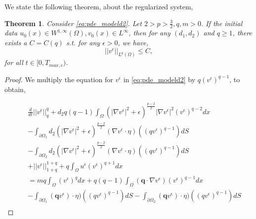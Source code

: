 \documentclass[10pt]{amsart}
\theoremstyle{plain}
\newtheorem{theorem}{Theorem}[section]
\theoremstyle{definition}
\begin{document}
\noindent We state the following theorem, about the regularized system,

\begin{theorem}
\label{thm:mt1-1}
    Consider \eqref{eq:pde_modeld2}. Let $2>p>\frac{3}{2}, q,m>0$. If the initial data $u_{0}(x) \in W^{1,\infty}(\Omega), v_{0}(x) \in L^{\infty}$, then for any $(d_{1},d_{2})$ and $q \geq 1$, there exists a $C=C(q)$ s.t. for any $ \epsilon > 0$, we have,
\begin{equation}
    ||v^{\epsilon}||_{L^{q}(\Omega)} \leq C,
\end{equation}
  for all $t \in [0, T_{max, \epsilon})$.
\end{theorem}

\begin{proof}
We multiply the equation for $v^{\epsilon}$ in \eqref{eq:pde_modeld2} by $q(v^{\epsilon})^{q-1}$, to obtain,










\begin{eqnarray}
&& \frac{d}{dt}||v^{\epsilon}||^{q}_{q} + d_{2}  q(q-1)\int_{\Omega} \left(
|\nabla v^{\epsilon}|^{2}+{\epsilon}\right)^{\frac{p-2}{2}}|\nabla v^{\epsilon}|^{2} (v^{\epsilon})^{q-2} dx \nonumber \\
&& -\int_{\partial \Omega_{1}} d_{2}\left(
|\nabla v^{\epsilon}|^{2}+{\epsilon}\right)^{\frac{p-2}{2}}( \nabla v^{\epsilon} \cdot \eta ) ((qv^{\epsilon})^{q-1}) dS \nonumber \\
&& -\int_{\partial \Omega_{2}} d_{2}\left(
|\nabla v^{\epsilon}|^{2}+{\epsilon}\right)^{\frac{p-2}{2}}( \nabla v^{\epsilon} \cdot \eta ) ((qv^{\epsilon})^{q-1}) dS \nonumber \\
&&+||v^{\epsilon}||^{1+q}_{1+q} 
 + q\int_{\Omega}  u^{\epsilon}(v^{\epsilon})^{q+1}dx \nonumber \\
 && =mq\int_{\Omega} (v^{\epsilon})^{q}dx + q(q-1)\int_{\Omega} (\textbf{q}\cdot \nabla v^{\epsilon}) (v^{\epsilon})^{q-1}dx \nonumber \\
 && - \int_{\partial \Omega_{1}} (\textbf{q} v^{\epsilon}) \cdot \eta) ((qv^{\epsilon})^{q-1}) dS 
 - \int_{\partial \Omega_{2}} (\textbf{q} v^{\epsilon}) \cdot \eta) ((qv^{\epsilon})^{q-1}) dS 
 \nonumber \\
\end{eqnarray}


\end{proof}
\end{document}
